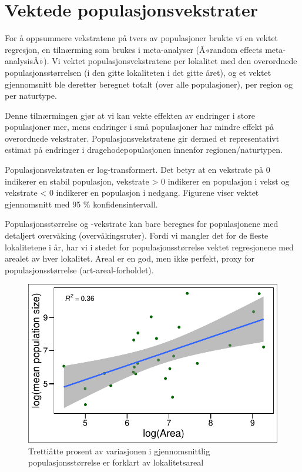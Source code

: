 \documentclass[
  letterpaper,
  DIV=11,
  numbers=noendperiod]{scrreport}
\begin{document}

\hypertarget{vektede-populasjonsvekstrater}{%
\chapter{Vektede
populasjonsvekstrater}\label{vektede-populasjonsvekstrater}}

For å oppsummere vekstratene på tvers av populasjoner brukte vi en
vektet regresjon, en tilnærming som brukes i meta-analyser (Â«random
effects meta-analysisÂ»). Vi vektet populasjonsvekstratene per lokalitet
med den overordnede populasjonsstørrelsen (i den gitte lokaliteten i det
gitte året), og et vektet gjennomsnitt ble deretter beregnet totalt
(over alle populasjoner), per region og per naturtype.

Denne tilnærmingen gjør at vi kan vekte effekten av endringer i store
populasjoner mer, mens endringer i små populasjoner har mindre effekt på
overordnede vekstrater. Populasjonsvekstratene gir dermed et
representativt estimat på endringer i dragehodepopulasjonen innenfor
regionen/naturtypen.

Populasjonsvekstraten er log-transformert. Det betyr at en vekstrate på
0 indikerer en stabil populasjon, vekstrate \textgreater{} 0 indikerer
en populasjon i vekst og vekstrate \textless{} 0 indikerer en populasjon
i nedgang. Figurene viser vektet gjennomsnitt med 95 \%
konfidensintervall.

Populasjonsstørrelse og -vekstrate kan bare beregnes for populasjonene
med detaljert overvåking (overvåkingsruter). Fordi vi mangler det for de
fleste lokalitetene i år, har vi i stedet for populasjonsstørrelse
vektet regresjonene med arealet av hver lokalitet. Areal er en god, men
ikke perfekt, proxy for populasjonsstørrelse (art-areal-forholdet).

\begin{figure}

{\centering \includegraphics{growthRate_meta_files/figure-pdf/unnamed-chunk-1-1.pdf}

}

\caption{Trettiåtte prosent av variasjonen i gjennomsnittlig
populasjonsstørrelse er forklart av lokalitetsareal}

\end{figure}
\end{document}
